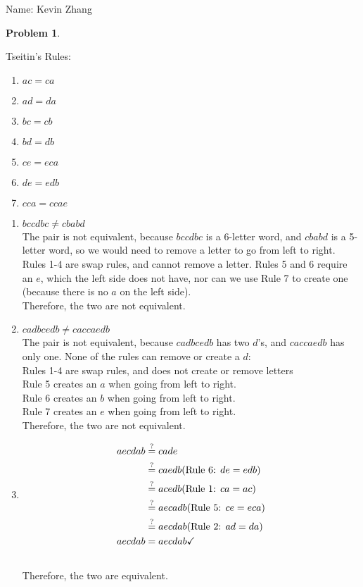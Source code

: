 \documentclass[11pt]{article}
\newcommand{\yourname}{Kevin Zhang}
\theoremstyle{definition}
\theoremstyle{case}
\theoremstyle{theorem}
\newtheorem{prob}{Problem}
\begin{document}
{\large
\noindent Name: \yourname}

\vspace{15pt}

\begin{prob}\end{prob}

Tseitin's Rules: 
\indent
\begin{enumerate}
\item $ac = ca$
\item $ad = da$
\item $bc = cb$
\item $bd = db$
\item $ce = eca$
\item $de = edb$
\item $cca = ccae$
\end{enumerate}

\begin{enumerate}[label=(\alph*)]
\item
$bccdbc \neq cbabd$ \\
The pair is not equivalent, because $bccdbc$ is a 6-letter word, and $cbabd$ is a 5-letter word, so we would need to remove a letter to go from left to right. 
Rules 1-4 are swap rules, and cannot remove a letter. Rules 5 and 6 require an $e$, 
which the left side does not have, nor can we use Rule 7 to create one (because there is no $a$ on the left side). \\
Therefore, the two are not equivalent. 

\item
$cadbcedb \neq caccaedb$ \\
The pair is not equivalent, because $cadbcedb$ has two $d$'s, and $caccaedb$ has only one. None of the rules can remove or create a $d$:\\
\indent Rules 1-4 are swap rules, and does not create or remove letters\\
\indent Rule 5 creates an $a$ when going from left to right.\\
\indent Rule 6 creates an $b$ when going from left to right.\\
\indent Rule 7 creates an $e$ when going from left to right.\\
Therefore, the two are not equivalent.

\item
\begin{align*}
  aecdab &\stackrel{?}{=} cade \\
         &\stackrel{?}{=} caedb \space \text{(Rule 6: $de = edb$)} \\
         &\stackrel{?}{=} acedb \space \text{(Rule 1: $ca = ac$)} \\
         &\stackrel{?}{=} aecadb \space \text{(Rule 5: $ce = eca$)} \\
         &\stackrel{?}{=} aecdab \space \text{(Rule 2: $ad = da$)} \\
  aecdab &= aecdab \checkmark
\end{align*}\\
Therefore, the two are equivalent.
\end{enumerate}
\end{document}
